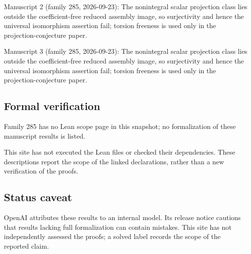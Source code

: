 \documentclass[11pt]{article}
\begin{document}
Manuscript 2 (family 285, 2026-09-23): The nonintegral scalar projection class lies outside the coefficient-free reduced assembly image, so surjectivity and hence the universal isomorphism assertion fail; torsion freeness is used only in the projection-conjecture paper.

Manuscript 3 (family 285, 2026-09-23): The nonintegral scalar projection class lies outside the coefficient-free reduced assembly image, so surjectivity and hence the universal isomorphism assertion fail; torsion freeness is used only in the projection-conjecture paper.

\subsection{Formal verification}
Family 285 has no Lean scope page in this snapshot; no formalization of these manuscript results is listed.

This site has not executed the Lean files or checked their dependencies. These descriptions report the scope of the linked declarations, rather than a new verification of the proofs.

\subsection{Status caveat}
OpenAI attributes these results to an internal model. Its release notice cautions that results lacking full formalization can contain mistakes. This site has not independently assessed the proofs; a solved label records the scope of the reported claim.
\end{document}
